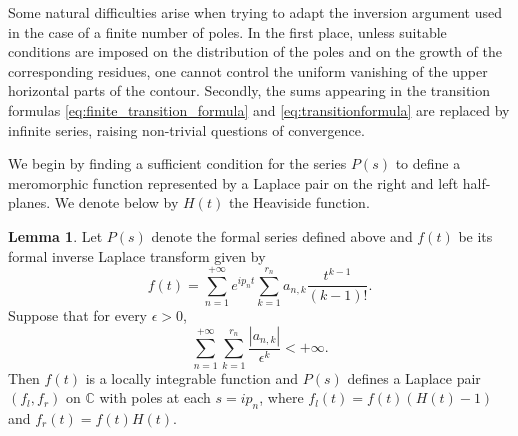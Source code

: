 \documentclass[12pt]{article}
\theoremstyle{definition}
\newtheorem{lemma}[theorem]{Lemma}
\begin{document}
Some natural difficulties arise when trying to adapt the inversion argument used in the case of a finite number of poles.
In the first place, unless suitable conditions are imposed on the distribution of the poles and on the growth of the corresponding residues, one cannot control the uniform vanishing of the upper horizontal parts of the contour.
Secondly, the sums appearing in the transition formulas \eqref{eq:finite_transition_formula} and \eqref{eq:transitionformula} are replaced by infinite series, raising non-trivial questions of convergence.

We begin by finding a sufficient condition for the series $P(s)$ to define a meromorphic function represented by a Laplace pair on the right and left half-planes. We denote below by $H(t)$ the Heaviside function.

\begin{lemma}\label{lem:polespart}
Let $P(s)$ denote the formal series defined above and $f(t)$ be its formal inverse Laplace transform given by \begin{equation}\label{eq:formalinverse}
    f(t)=\sum_{n=1}^{+\infty} e^{ip_n t}\sum_{k=1}^{r_n}a_{n,k}\frac{t^{k-1}}{(k-1)!}.
\end{equation} Suppose that for every $\epsilon>0$,
\begin{equation}\label{eq:convergenceinfinitepoles}
\sum_{n=1}^{+\infty}\sum_{k=1}^{r_n}\frac{|a_{n,k}|}{\epsilon^k}<+\infty.
\end{equation}
Then $f(t)$ is a locally integrable function and $P(s)$ defines a Laplace pair \( (f_l, f_r) \) on $\mathbb{C}$ with poles at each $s=ip_n$, where \(f_l(t)=f(t)(H(t)-1)\) and \(f_r(t)= f(t)H(t)\).  

\end{lemma}
\end{document}
